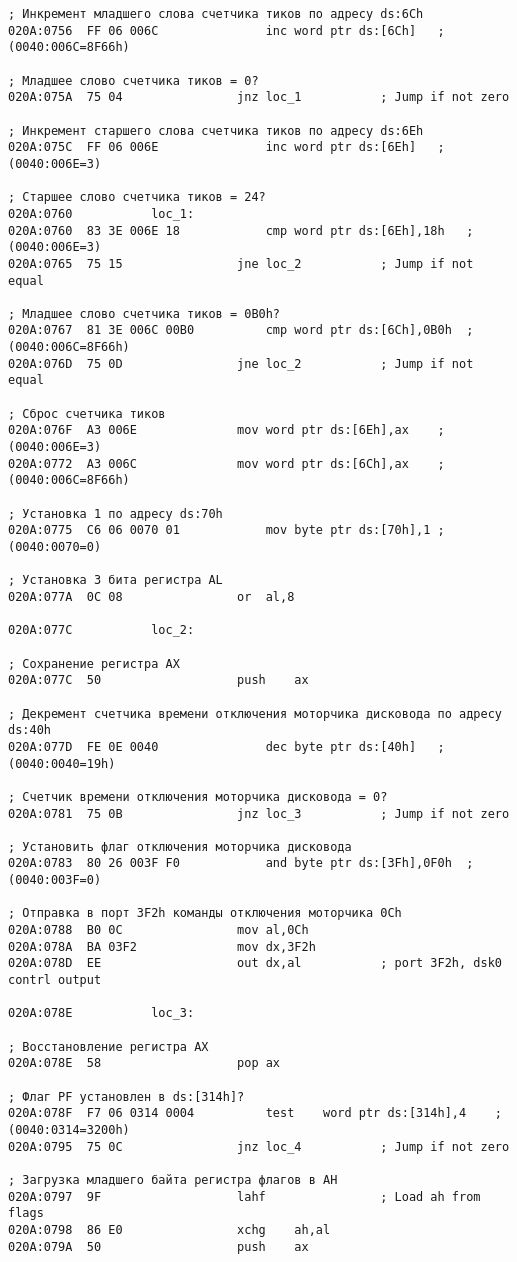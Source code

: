 \begin{center}
\begin{lstlisting}[style={asm}, caption = Прерывание int 8h]
; Инкремент младшего слова счетчика тиков по адресу ds:6Ch
020A:0756  FF 06 006C				inc	word ptr ds:[6Ch]	; (0040:006C=8F66h)

; Mладшее слово счетчика тиков = 0?
020A:075A  75 04				jnz	loc_1			; Jump if not zero

; Инкремент старшего слова счетчика тиков по адресу ds:6Eh
020A:075C  FF 06 006E				inc	word ptr ds:[6Eh]	; (0040:006E=3)

; Старшее слово счетчика тиков = 24?
020A:0760			loc_1:
020A:0760  83 3E 006E 18			cmp	word ptr ds:[6Eh],18h	; (0040:006E=3)
020A:0765  75 15				jne	loc_2			; Jump if not equal

; Младшее слово счетчика тиков = 0B0h?
020A:0767  81 3E 006C 00B0			cmp	word ptr ds:[6Ch],0B0h	; (0040:006C=8F66h)
020A:076D  75 0D				jne	loc_2			; Jump if not equal

; Сброс счетчика тиков
020A:076F  A3 006E				mov	word ptr ds:[6Eh],ax	; (0040:006E=3)
020A:0772  A3 006C				mov	word ptr ds:[6Ch],ax	; (0040:006C=8F66h)

; Установка 1 по адресу ds:70h
020A:0775  C6 06 0070 01			mov	byte ptr ds:[70h],1	; (0040:0070=0)

; Установка 3 бита регистра AL
020A:077A  0C 08				or	al,8

020A:077C			loc_2:

; Сохранение регистра AX
020A:077C  50					push	ax

; Декремент счетчика времени отключения моторчика дисковода по адресу ds:40h
020A:077D  FE 0E 0040				dec	byte ptr ds:[40h]	; (0040:0040=19h)

; Счетчик времени отключения моторчика дисковода = 0?
020A:0781  75 0B				jnz	loc_3			; Jump if not zero

; Установить флаг отключения моторчика дисковода
020A:0783  80 26 003F F0			and	byte ptr ds:[3Fh],0F0h	; (0040:003F=0)

; Отправка в порт 3F2h команды отключения моторчика 0Ch
020A:0788  B0 0C				mov	al,0Ch
020A:078A  BA 03F2				mov	dx,3F2h
020A:078D  EE					out	dx,al			; port 3F2h, dsk0 contrl output

020A:078E			loc_3:

; Восстановление регистра AX
020A:078E  58					pop	ax

; Флаг PF установлен в ds:[314h]?
020A:078F  F7 06 0314 0004			test	word ptr ds:[314h],4	; (0040:0314=3200h)
020A:0795  75 0C				jnz	loc_4			; Jump if not zero

; Загрузка младшего байта регистра флагов в AH
020A:0797  9F					lahf				; Load ah from flags
020A:0798  86 E0				xchg	ah,al
020A:079A  50					push	ax


\end{lstlisting}
\end{center}
